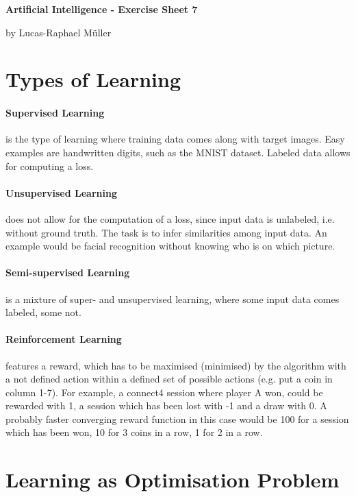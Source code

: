 \documentclass[11pt,a4paper,twoside]{article}
\begin{document}
\renewcommand\thesubsection{\alph{subsection})}

\lstset {
language = bash,
	breaklines = true,
	breakatwhitespace = true
}

\centerline{\LARGE \textbf{Artificial Intelligence - Exercise Sheet 7}}\vspace{0.5em}
\centerline{\large by Lucas-Raphael Müller}\vspace{2em}


\section{Types of Learning}
\paragraph{Supervised Learning} is the type of learning where training data comes along with target images. Easy examples are handwritten digits, such as the MNIST dataset. Labeled data allows for computing a loss.
\paragraph{Unsupervised Learning} does not allow for the computation of a loss, since input data is unlabeled, i.e. without ground truth.
The task is to infer similarities among input data.  
An example would be facial recognition without knowing who is on which picture.
\paragraph{Semi-supervised Learning} is a mixture of super- and unsupervised learning, where some input data comes labeled, some not.
\paragraph{Reinforcement Learning} features a reward, which has to be maximised (minimised) by the algorithm with a not defined action within a defined set of possible actions (e.g. put a coin in column 1-7).
For example, a connect4 session where player A won, could be rewarded with 1, a session which has been lost with -1 and a draw with 0.
A probably faster converging reward function in this case would be 100 for a session which has been won, 10 for 3 coins in a row, 1 for 2 in a row.

\section{Learning as Optimisation Problem}
\end{document}
